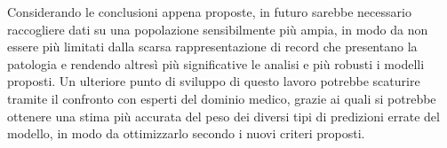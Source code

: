 Considerando le conclusioni appena proposte, in futuro sarebbe necessario raccogliere dati su una popolazione sensibilmente più ampia, in modo da non essere più limitati dalla scarsa rappresentazione di record che presentano la patologia e rendendo altresì più significative le analisi e più robusti i modelli proposti.
Un ulteriore punto di sviluppo di questo lavoro potrebbe scaturire tramite il confronto con esperti del dominio medico, grazie ai quali si potrebbe ottenere una stima più accurata del peso dei diversi tipi di predizioni errate del modello, in modo da ottimizzarlo secondo i nuovi criteri proposti.

